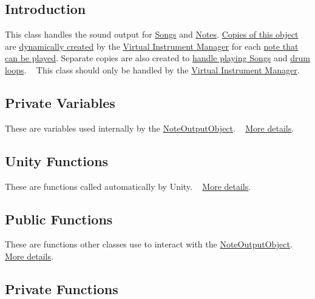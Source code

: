 \hypertarget{group___doc_n_o_o_DocNOOIntro}{}\subsection{Introduction}\label{group___doc_n_o_o_DocNOOIntro}
This class handles the sound output for \hyperlink{class_song}{Songs} and \hyperlink{group___v_i_m_event_types_class_virtual_instrument_manager_1_1_play_note_event}{Notes}. \hyperlink{group___v_i_m_priv_ga53f837fd01475fa35629a650e7fa00e3}{Copies of this object} are \hyperlink{group___v_i_m_priv_func_ga8817e32cc5074737b4d9489922b0fcb8}{dynamically created} by the \hyperlink{group___v_i_m}{Virtual Instrument Manager} for each \hyperlink{group___v_i_m_priv_ga5cedf9995d59b416412677e6004b659c}{note that can be played}. Separate copies are also created to \hyperlink{group___v_i_m_priv_gaa8d4f5642f5ac4dca4f4178b0052c78d}{handle playing Songs} and \hyperlink{group___v_i_m_priv_ga5f71cb71d240042312dcc13b481b068d}{drum loops}. ~\newline
 This class should only be handled by the \hyperlink{group___v_i_m}{Virtual Instrument Manager}.\hypertarget{group___doc_n_o_o_DocNOOPrivVar}{}\subsection{Private Variables}\label{group___doc_n_o_o_DocNOOPrivVar}
These are variables used internally by the \hyperlink{class_note_output_object}{Note\+Output\+Object}. ~\newline
 \hyperlink{group___n_o_o_priv_var}{More details}.\hypertarget{group___doc_n_o_o_DocNOOUnity}{}\subsection{Unity Functions}\label{group___doc_n_o_o_DocNOOUnity}
These are functions called automatically by Unity. ~\newline
 \hyperlink{group___n_o_o_unity}{More details}.\hypertarget{group___doc_n_o_o_DocNOOPubFunc}{}\subsection{Public Functions}\label{group___doc_n_o_o_DocNOOPubFunc}
These are functions other classes use to interact with the \hyperlink{class_note_output_object}{Note\+Output\+Object}. ~\newline
 \hyperlink{group___n_o_o_pub_func}{More details}.\hypertarget{group___doc_n_o_o_DocNOOPrivFunc}{}\subsection{Private Functions}\label{group___doc_n_o_o_DocNOOPrivFunc}
